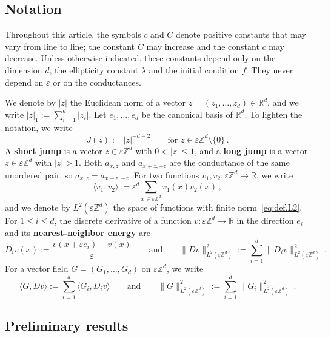 \documentclass[11pt]{amsart}
\numberwithin{equation}{section}
\newcommand{\Z}{\mathbb{Z}}
\newcommand{\R}{\mathbb{R}}
\newcommand{\eps}{\varepsilon}
\begin{document}
\subsection{Notation} \label{sec:not}

Throughout this article, the symbols $c$ and $C$ denote positive constants that may vary from line to line; the constant $C$ may increase and the constant $c$ may decrease.
Unless otherwise indicated, these constants depend only on the dimension $d$, the ellipticity constant $\lambda$ and the initial condition $f$.
They never depend on $\eps$ or on the conductances.

We denote by $|z|$ the Euclidean norm of a vector $z = (z_1, \ldots, z_d) \in \R^d$, and we write $|z|_1 := \sum_{i=1}^d |z_i|$.
Let $e_1, \ldots, e_d$ be the canonical basis of $\R^d$.
To lighten the notation, we write
\begin{equation*}
    J(z) := |z|^{-d-2} \qquad \text{for } z \in \eps \Z^d \setminus \{0\}\,.
\end{equation*}
A \textbf{short jump} is a vector $z \in \eps \Z^d$ with $0 < |z| \leq 1$, and a \textbf{long jump} is a vector $z \in \eps \Z^d$ with $|z| > 1$.
Both $a_{x,z}$ and $a_{x+z,-z}$ are the conductance of the same unordered pair, so $a_{x,z} = a_{x + z, -z}$.
For two functions $v_1, v_2 \colon \eps \Z^d \to \R$, we write
\begin{equation*}
    \langle v_1, v_2 \rangle := \eps^d \sum_{x \in \eps \Z^d} v_1(x) v_2(x)\,,
\end{equation*}
and we denote by $L^2(\eps \Z^d)$ the space of functions with finite norm~\eqref{eq:def.L2}.
For $1 \leq i \leq d$, the discrete derivative of a function $v \colon \eps \Z^d \to \R$ in the direction $e_i$ and its \textbf{nearest-neighbor energy} are
\begin{equation*}
    D_i v(x) := \frac{v(x + \eps e_i) - v(x)}{\eps}
    \qquad \text{and} \qquad
    \|D v\|_{L^2(\eps \Z^d)}^2 := \sum_{i=1}^d \|D_i v\|_{L^2(\eps \Z^d)}^2\,.
\end{equation*}
For a vector field $G = (G_1, \ldots, G_d)$ on $\eps \Z^d$, we write
\begin{equation*}
    \langle G, D v \rangle := \sum_{i=1}^d \langle G_i, D_i v \rangle
    \qquad \text{and} \qquad
    \|G\|_{L^2(\eps \Z^d)}^2 := \sum_{i=1}^d \|G_i\|_{L^2(\eps \Z^d)}^2\,.
\end{equation*}

\subsection{Preliminary results} \label{sec:prelim}
\end{document}
